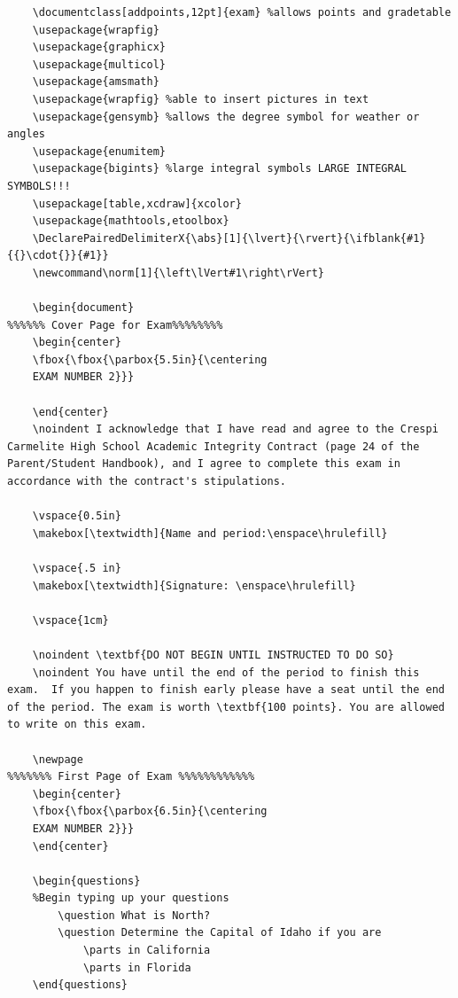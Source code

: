 \documentclass[12pt, letterpaper]{report}
\newcommand{\0}{\emptyset}
\theoremstyle{theorem}
\theoremstyle{definition}
\theoremstyle{definition}
\theoremstyle{definition}
\theoremstyle{definition}
\theoremstyle{theorem}
\theoremstyle{theorem}
\theoremstyle{remark}
\begin{document}
	\begin{lstlisting}
	\documentclass[addpoints,12pt]{exam} %allows points and gradetable
	\usepackage{wrapfig} 
	\usepackage{graphicx}
	\usepackage{multicol}
	\usepackage{amsmath}
	\usepackage{wrapfig} %able to insert pictures in text
	\usepackage{gensymb} %allows the degree symbol for weather or angles
	\usepackage{enumitem}
	\usepackage{bigints} %large integral symbols LARGE INTEGRAL SYMBOLS!!!
	\usepackage[table,xcdraw]{xcolor}
	\usepackage{mathtools,etoolbox}
	\DeclarePairedDelimiterX{\abs}[1]{\lvert}{\rvert}{\ifblank{#1}{{}\cdot{}}{#1}}
	\newcommand\norm[1]{\left\lVert#1\right\rVert}
	
	\begin{document}
%%%%%% Cover Page for Exam%%%%%%%%
	\begin{center}
	\fbox{\fbox{\parbox{5.5in}{\centering
	EXAM NUMBER 2}}}
	
	\end{center}
	\noindent I acknowledge that I have read and agree to the Crespi Carmelite High School Academic Integrity Contract (page 24 of the Parent/Student Handbook), and I agree to complete this exam in accordance with the contract's stipulations. 
	
	\vspace{0.5in}
	\makebox[\textwidth]{Name and period:\enspace\hrulefill}
	
	\vspace{.5 in}
	\makebox[\textwidth]{Signature: \enspace\hrulefill}
	
	\vspace{1cm}
	
	\noindent \textbf{DO NOT BEGIN UNTIL INSTRUCTED TO DO SO}
	\noindent You have until the end of the period to finish this exam.  If you happen to finish early please have a seat until the end of the period. The exam is worth \textbf{100 points}. You are allowed to write on this exam.
	
	\newpage
%%%%%%% First Page of Exam %%%%%%%%%%%%	
	\begin{center}
	\fbox{\fbox{\parbox{6.5in}{\centering
	EXAM NUMBER 2}}}
	\end{center}
	
	\begin{questions}
	%Begin typing up your questions
		\question What is North?
		\question Determine the Capital of Idaho if you are
			\parts in California
			\parts in Florida
	\end{questions}

	\end{lstlisting}
	
\end{document}
